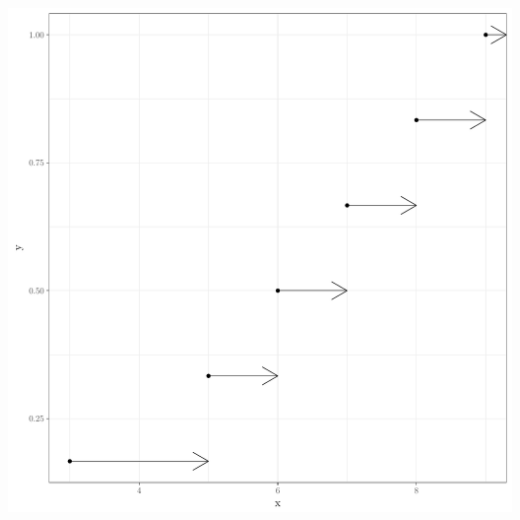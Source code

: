 \begin{enumerate}
\begin{minipage}{0.6\textwidth}
\begin{center}
\includegraphics[scale=0.5]{auto_figures_tikz/2012_2013_fig_02_empirical_dist.pdf}
\end{center}
\end{minipage}
\end{enumerate}
